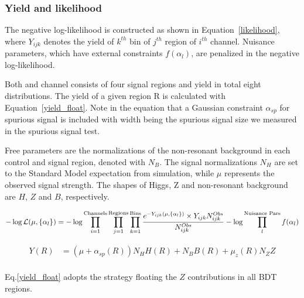 \label{sec:vbf-likelihood}

\subsubsection{Yield and likelihood}
The negative log-likelihood is constructed as shown in Equation~\ref{likelihood}, 
where $Y_{ijk}$ denotes the yield of $k^{th}$ bin of $j^{th}$ region of $i^{th}$ channel. 
Nuisance parameters, which have external constraints $f(\alpha_l)$, are penalized in the negative log-likelihood. 

Both \twocentral{} and  \fourcentral{} channel consists of four signal regions and yield in total eight \Mbb{} distributions.
The yield of a given region R is calculated with Equation~\ref{yield_float}. Note in the equation that a Gaussian constraint $\alpha_{sp}$  for spurious signal is included with width being the spurious signal size we measured in the spurious signal test.

Free parameters are the normalizations of the non-resonant background in each control and
signal region, denoted with $N_B$.
The signal normalizations $N_H$ are set to the Standard Model expectation from simulation,
while $\mu$ represents the observed signal strength.
The shapes of Higgs, Z and non-resonant background are $H$, $Z$ and $B$, respectively.

\begin{equation}
\label{likelihood}
-\log\mathcal{L}(\mu, \{\alpha_{l}\} )= -\log \prod_{i=1}^{\textnormal{Channels}} \prod_{j=1}^{\textnormal{Regions}} \prod_{k=1}^{\textnormal{Bins}} \frac{e^{-Y_{ijk}(\mu, \{\alpha_l\})} \times Y_{ijk}N_{ijk}^{Obs} }{N_{ijk}^{Obs}} - \log \prod_{l}^{\textnormal{Nuisance Pars}} f(\alpha_l)
\end{equation}

\begin{equation}
\label{yield_float}
\begin{split}
Y(R) &= (\mu + \alpha_{sp}(R))N_{H}H(R)+ N_{B}B(R)+ \mu_{z}(R)N_{Z}Z  \\
\end{split}
\end{equation}


Eq.\ref{yield_float} adopts the strategy floating the $Z$ contributions in all BDT regions. 



